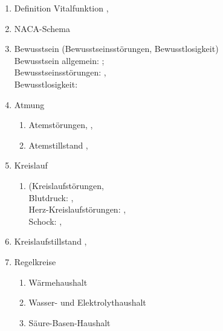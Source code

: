   \begin{enumerate}\item
    
    Definition Vitalfunktion \dotfill {},
    \item    NACA-Schema \dotfill {}
    \item    Bewusstsein (Bewusstseinsstörungen, Bewusstlosigkeit)
    \\
    \noindent Bewusstsein
    allgemein:  \dotfill {};
    \\
    Bewusstseinsstörungen: \dotfill
    ,
    \\
    Bewusstlosigkeit: \dotfill  {}
    \item
    Atmung
    \begin{enumerate}
      \item      Atemstörungen, \dotfill {},
      \item      Atemstillstand \dotfill {},
    \end{enumerate}
    \item    Kreislauf
    \begin{enumerate}
      \item      (Kreislaufstörungen,
      \\
      Blutdruck:  \dotfill {},\\
      Herz-Kreislaufstörungen: \dotfill
      ,\\
      Schock: \dotfill
      , 
    \end{enumerate}
    \item    Kreislaufstillstand \dotfill  {},
    \item    Regelkreise
    \begin{enumerate}
      \item      Wärmehaushalt \dotfill {}
      \item      Wasser- und Elektrolythaushalt \dotfill  {}
      \item      Säure-Basen-Haushalt \dotfill  {}

\end{enumerate}
\end{enumerate}
